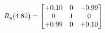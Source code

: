 \documentclass[preview]{standalone}
\begin{document}
\begin{align*}
\special{dvisvgm:raw <g id='unique000'>}R_{y}(4.82) = \begin{bmatrix}+0.10 & 0 & -0.99 \\0 & 1 & 0 \\+0.99 & 0 & +0.10\end{bmatrix}\special{dvisvgm:raw </g>}
\end{align*}
\end{document}
